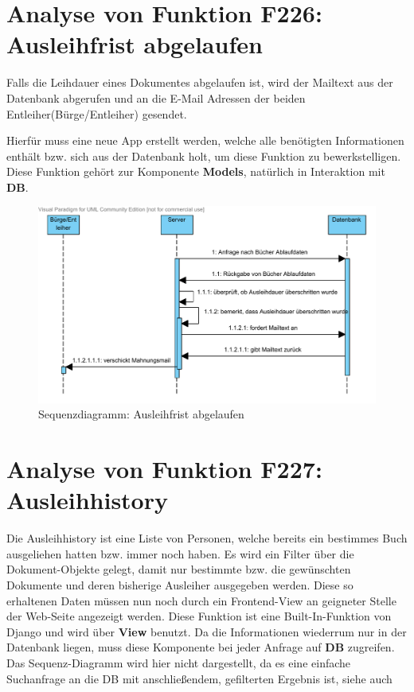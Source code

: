 \section{Analyse von Funktion F226: Ausleihfrist abgelaufen}
Falls die Leihdauer eines Dokumentes abgelaufen ist, wird der Mailtext aus der 
Datenbank abgerufen und an die E-Mail Adressen der beiden Entleiher(Bürge/Entleiher) gesendet.

Hierfür muss eine neue App erstellt werden, welche alle benötigten Informationen enthält bzw. sich aus der Datenbank holt, um diese Funktion zu bewerkstelligen.
Diese Funktion gehört zur Komponente \textbf{Models}, natürlich in Interaktion mit \textbf{DB}.
\begin{figure}
\includegraphics[width=0.8\linewidth]{bilder/SeqMail.pdf}
\caption{Sequenzdiagramm: Ausleihfrist abgelaufen}
\label{fig:226}
\end{figure}

\section{Analyse von Funktion F227: Ausleihhistory}
\label{f:227}
Die Ausleihhistory ist eine Liste von Personen, welche bereits ein bestimmes Buch ausgeliehen hatten bzw. immer noch haben.
Es wird ein Filter über die Dokument-Objekte gelegt, damit nur bestimmte bzw. die gewünschten Dokumente und deren bisherige Ausleiher ausgegeben werden. Diese so erhaltenen Daten müssen nun noch durch ein Frontend-View an geigneter Stelle der Web-Seite angezeigt werden.
Diese Funktion ist eine Built-In-Funktion von Django und wird über \textbf{View} benutzt. Da die Informationen wiederrum nur in der Datenbank liegen, muss diese Komponente bei jeder Anfrage auf \textbf{DB} zugreifen.
Das Sequenz-Diagramm wird hier nicht dargestellt, da es eine einfache Suchanfrage an die DB mit anschließendem, gefilterten Ergebnis ist, siehe auch 

